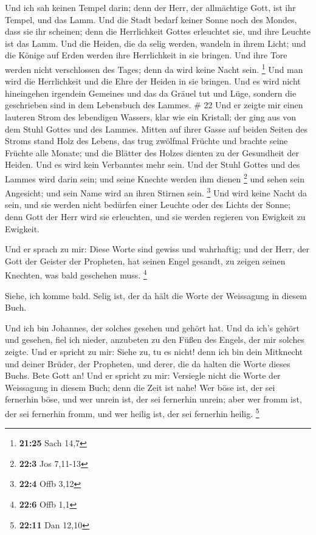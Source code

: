  Und ich sah keinen Tempel darin; denn der Herr, der
allmächtige Gott, ist ihr Tempel, und das Lamm.  Und die
Stadt bedarf keiner Sonne noch des Mondes, dass sie ihr scheinen; denn
die Herrlichkeit Gottes erleuchtet sie, und ihre Leuchte ist das Lamm.
 Und die Heiden, die da selig werden, wandeln in ihrem
Licht; und die Könige auf Erden werden ihre Herrlichkeit in sie bringen.
 Und ihre Tore werden nicht verschlossen des Tages; denn da
wird keine Nacht sein. \footnote{\textbf{21:25} Sach 14,7} 
Und man wird die Herrlichkeit und die Ehre der Heiden in sie bringen.
 Und es wird nicht hineingehen irgendein Gemeines und das
da Gräuel tut und Lüge, sondern die geschrieben sind in dem Lebensbuch
des Lammes. \# 22  Und er zeigte mir einen lauteren Strom
des lebendigen Wassers, klar wie ein Kristall; der ging aus von dem
Stuhl Gottes und des Lammes.  Mitten auf ihrer Gasse auf
beiden Seiten des Stroms stand Holz des Lebens, das trug zwölfmal
Früchte und brachte seine Früchte alle Monate; und die Blätter des
Holzes dienten zu der Gesundheit der Heiden.  Und es wird
kein Verbanntes mehr sein. Und der Stuhl Gottes und des Lammes wird
darin sein; und seine Knechte werden ihm dienen \footnote{\textbf{22:3}
  Jos 7,11-13}  und sehen sein Angesicht; und sein Name wird
an ihren Stirnen sein. \footnote{\textbf{22:4} Offb 3,12} 
Und wird keine Nacht da sein, und sie werden nicht bedürfen einer
Leuchte oder des Lichts der Sonne; denn Gott der Herr wird sie
erleuchten, und sie werden regieren von Ewigkeit zu Ewigkeit.

 Und er sprach zu mir: Diese Worte sind gewiss und
wahrhaftig; und der Herr, der Gott der Geister der Propheten, hat seinen
Engel gesandt, zu zeigen seinen Knechten, was bald geschehen muss.
\footnote{\textbf{22:6} Offb 1,1}

 Siehe, ich komme bald. Selig ist, der da hält die Worte der
Weissagung in diesem Buch.

 Und ich bin Johannes, der solches gesehen und gehört hat.
Und da ich's gehört und gesehen, fiel ich nieder, anzubeten zu den Füßen
des Engels, der mir solches zeigte.  Und er spricht zu mir:
Siehe zu, tu es nicht! denn ich bin dein Mitknecht und deiner Brüder,
der Propheten, und derer, die da halten die Worte dieses Buchs. Bete
Gott an!  Und er spricht zu mir: Versiegle nicht die Worte
der Weissagung in diesem Buch; denn die Zeit ist nahe!  Wer
böse ist, der sei fernerhin böse, und wer unrein ist, der sei fernerhin
unrein; aber wer fromm ist, der sei fernerhin fromm, und wer heilig ist,
der sei fernerhin heilig. \footnote{\textbf{22:11} Dan 12,10}


